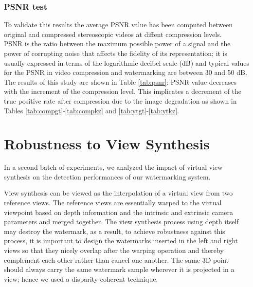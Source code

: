 \subsubsection{PSNR test}
To validate this results the average PSNR value has been computed between original and compressed  stereoscopic videos at diffent compression levels.\\
PSNR is the ratio between the maximum possible power of a signal and the power of corrupting noise that affects the fidelity of its representation; it is usually expressed in terms of the logarithmic decibel scale (dB) and typical values for the PSNR in video compression and watermarking are between 30 and 50 dB.
The results of this study are shown in Table \ref{tab:psnr}: PSNR value decreases with the increment of the compression level. This implicates a decrement of the true positive rate after compression due to the image degradation as shown in Tables \ref{tab:compgt}-\ref{tab:compkz} and \ref{tab:ytgt}-\ref{tab:ytkz}.\\
\begin{table}[htbp]
\begin{center}
\caption{\small{Average PSNR values between original video and compressed videos at different compression levels. The acronym YT stands for YouTube compression level, whose value is between 25 and 30 as the PSNR results show.} \label{tab:psnr}}
\end{center}
\end{table}

\section{Robustness to View Synthesis}
 
In a second batch of experiments, we analyzed the impact of virtual view synthesis on the detection performances of our watermarking system.

View synthesis can be viewed as the interpolation of a virtual view from two reference views. The reference views are essentially warped to the virtual viewpoint based on depth information and the intrinsic and extrinsic camera parameters and merged together.\newline
The view synthesis process using depth itself may destroy the watermark, as a result, to achieve robustness against this process, it is important to design the watermarks inserted in the left and right views so that they nicely overlap after the warping operation and thereby complement each other rather than cancel one another. The same 3D point should always carry the same watermark sample wherever it is projected in a view; hence we used a disparity-coherent technique.

